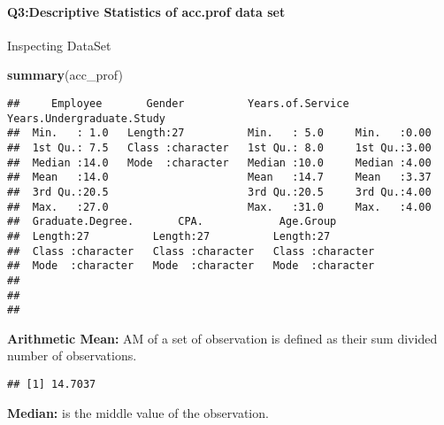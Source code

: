 \documentclass[
]{article}
\newenvironment{Shaded}{\begin{snugshade}}{\end{snugshade}}
\newcommand{\CommentTok}[1]{\textcolor[rgb]{0.56,0.35,0.01}{\textit{#1}}}
\newcommand{\KeywordTok}[1]{\textcolor[rgb]{0.13,0.29,0.53}{\textbf{#1}}}
\newcommand{\NormalTok}[1]{#1}
\newcommand{\OperatorTok}[1]{\textcolor[rgb]{0.81,0.36,0.00}{\textbf{#1}}}
\begin{document}
\hypertarget{q3descriptive-statistics-of-acc.prof-data-set}{%
\paragraph{Q3:Descriptive Statistics of acc.prof data
set}\label{q3descriptive-statistics-of-acc.prof-data-set}}

Inspecting DataSet

\begin{Shaded}
\begin{Highlighting}[]
\KeywordTok{summary}\NormalTok{(acc\_prof)}
\end{Highlighting}
\end{Shaded}

\begin{verbatim}
##     Employee       Gender          Years.of.Service Years.Undergraduate.Study
##  Min.   : 1.0   Length:27          Min.   : 5.0     Min.   :0.00             
##  1st Qu.: 7.5   Class :character   1st Qu.: 8.0     1st Qu.:3.00             
##  Median :14.0   Mode  :character   Median :10.0     Median :4.00             
##  Mean   :14.0                      Mean   :14.7     Mean   :3.37             
##  3rd Qu.:20.5                      3rd Qu.:20.5     3rd Qu.:4.00             
##  Max.   :27.0                      Max.   :31.0     Max.   :4.00             
##  Graduate.Degree.       CPA.            Age.Group        
##  Length:27          Length:27          Length:27         
##  Class :character   Class :character   Class :character  
##  Mode  :character   Mode  :character   Mode  :character  
##                                                          
##                                                          
## 
\end{verbatim}

\textbf{Arithmetic Mean:} AM of a set of observation is defined as their
sum divided number of observations.

\begin{Shaded}
\end{Shaded}

\begin{verbatim}
## [1] 14.7037
\end{verbatim}

\textbf{Median:} is the middle value of the observation.
\end{document}
